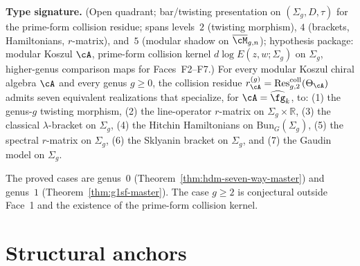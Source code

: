 \begin{conjecture}
\label{conj:g1sf-higher-genus}
\ClaimStatusConjectured
{}
\textbf{Type signature.} (Open quadrant; bar/twisting presentation on
$(\Sigma_g, D, \tau)$ for the prime-form collision residue; spans
levels~$2$ \textup{(}twisting morphism\textup{)}, $4$
\textup{(}brackets, Hamiltonians, $r$-matrix\textup{)}, and~$5$
\textup{(}modular shadow on $\overline{\cM}_{g,n}$\textup{)};
hypothesis package: modular Koszul $\cA$, prime-form collision
kernel $d\log E(z,w;\Sigma_g)$ on $\Sigma_g$, higher-genus comparison
maps for Faces~F2--F7.)
For every modular Koszul chiral algebra $\cA$ and every genus
$g \geq 0$, the collision residue
$r_\cA^{(g)} = \operatorname{Res}^{\mathrm{coll}}_{g,2}(\Theta_\cA)$
admits seven equivalent realizations that specialize, for
$\cA = \widehat{\fg}_k$, to: \textup{(1)} the genus-$g$ twisting
morphism, \textup{(2)} the line-operator $r$-matrix on
$\Sigma_g \times \mathbb{R}$, \textup{(3)} the classical
$\lambda$-bracket on $\Sigma_g$, \textup{(4)} the Hitchin
Hamiltonians on $\mathrm{Bun}_G(\Sigma_g)$, \textup{(5)} the spectral
$r$-matrix on $\Sigma_g$, \textup{(6)} the Sklyanin bracket on
$\Sigma_g$, and \textup{(7)} the Gaudin model on $\Sigma_g$.
\end{conjecture}

The proved cases are genus~$0$
(Theorem~\ref{thm:hdm-seven-way-master}) and genus~$1$
(Theorem~\ref{thm:g1sf-master}). The case $g\geq2$ is conjectural
outside Face~1 and the existence of the prime-form collision kernel.

\section{Structural anchors}
\label{sec:g1sf-anchors}

